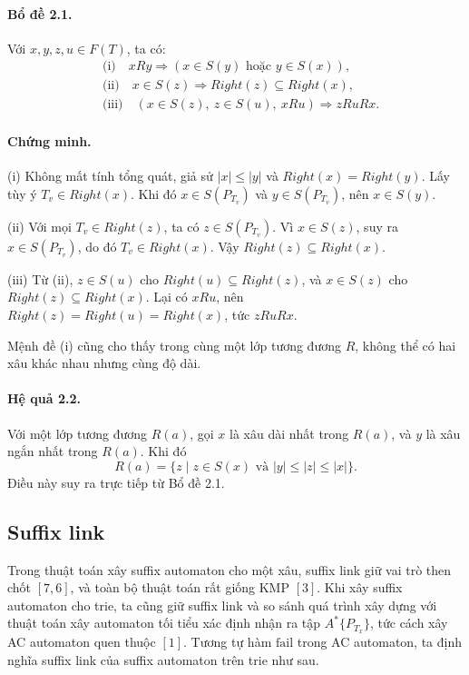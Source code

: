 \documentclass[11pt]{article}
\begin{document}
\paragraph{Bổ đề 2.1.}
Với \(x,y,z,u\in F(T)\), ta có:
\[
\begin{aligned}
&\text{(i)}\quad xRy \Rightarrow (x\in S(y)\text{ hoặc }y\in S(x)),\\
&\text{(ii)}\quad x\in S(z) \Rightarrow Right(z)\subseteq Right(x),\\
&\text{(iii)}\quad (x\in S(z),\ z\in S(u),\ xRu)\Rightarrow zRuRx.
\end{aligned}
\]

\paragraph{Chứng minh.}
(i) Không mất tính tổng quát, giả sử \(|x|\le |y|\) và
\(Right(x)=Right(y)\). Lấy tùy ý \(T_v\in Right(x)\). Khi đó
\(x\in S(P_{T_v})\) và \(y\in S(P_{T_v})\), nên \(x\in S(y)\).

(ii) Với mọi \(T_v\in Right(z)\), ta có \(z\in S(P_{T_v})\). Vì \(x\in S(z)\),
suy ra \(x\in S(P_{T_v})\), do đó \(T_v\in Right(x)\). Vậy
\(Right(z)\subseteq Right(x)\).

(iii) Từ (ii), \(z\in S(u)\) cho \(Right(u)\subseteq Right(z)\), và
\(x\in S(z)\) cho \(Right(z)\subseteq Right(x)\). Lại có \(xRu\), nên
\(Right(z)=Right(u)=Right(x)\), tức \(zRuRx\).

Mệnh đề (i) cũng cho thấy trong cùng một lớp tương đương \(R\), không thể có hai
xâu khác nhau nhưng cùng độ dài.

\paragraph{Hệ quả 2.2.}
Với một lớp tương đương \(R(a)\), gọi \(x\) là xâu dài nhất trong \(R(a)\), và
\(y\) là xâu ngắn nhất trong \(R(a)\). Khi đó
\[
  R(a)=\{z\mid z\in S(x)\text{ và } |y|\le |z|\le |x|\}.
\]
Điều này suy ra trực tiếp từ Bổ đề 2.1.

\subsection{Suffix link}

Trong thuật toán xây suffix automaton cho một xâu, suffix link giữ vai trò then
chốt \([7,6]\), và toàn bộ thuật toán rất giống KMP \([3]\). Khi xây suffix
automaton cho trie, ta cũng giữ suffix link và so sánh quá trình xây dựng với
thuật toán xây automaton tối tiểu xác định nhận ra tập \(A^*\{P_{T_x}\}\), tức
cách xây AC automaton quen thuộc \([1]\). Tương tự hàm \(\mathrm{fail}\) trong
AC automaton, ta định nghĩa suffix link của suffix automaton trên trie như sau.
\end{document}
